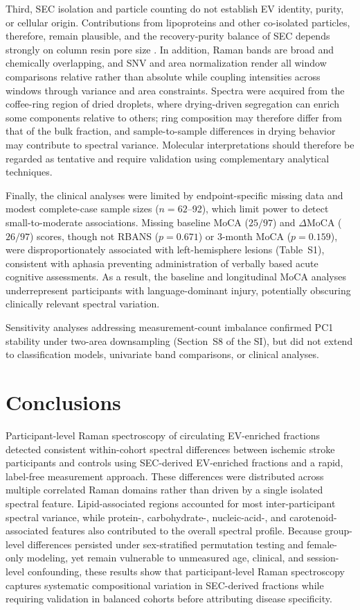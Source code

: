 \documentclass[preprint,12pt]{elsarticle}
\begin{document}
Third, SEC isolation and particle counting do not establish EV identity, purity, or cellular origin. Contributions from lipoproteins and other co-isolated particles, therefore, remain plausible, and the recovery-purity balance of SEC depends strongly on column resin pore size \cite{bracht2024}. In addition, Raman bands are broad and chemically overlapping, and SNV and area normalization render all window comparisons relative rather than absolute while coupling intensities across windows through variance and area constraints. Spectra were acquired from the coffee-ring region of dried droplets, where drying-driven segregation can enrich some components relative to others; ring composition may therefore differ from that of the bulk fraction, and sample-to-sample differences in drying behavior may contribute to spectral variance. Molecular interpretations should therefore be regarded as tentative and require validation using complementary analytical techniques.

Finally, the clinical analyses were limited by endpoint-specific missing data and modest complete-case sample sizes ($n=62$--92), which limit power to detect small-to-moderate associations. Missing baseline MoCA ($25/97$) and $\Delta$MoCA ($26/97$) scores, though not RBANS ($p=0.671$) or 3-month MoCA ($p=0.159$), were disproportionately associated with left-hemisphere lesions (Table~S1), consistent with aphasia preventing administration of verbally based acute cognitive assessments. As a result, the baseline and longitudinal MoCA analyses underrepresent participants with language-dominant injury, potentially obscuring clinically relevant spectral variation.

Sensitivity analyses addressing measurement-count imbalance confirmed PC1 stability under two-area downsampling (Section~S8 of the SI), but did not extend to classification models, univariate band comparisons, or clinical analyses.


\section{Conclusions} 
\label{sec:conclusions}

Participant-level Raman spectroscopy of circulating EV-enriched fractions detected consistent within-cohort spectral differences between ischemic stroke participants and controls using SEC-derived EV-enriched fractions and a rapid, label-free measurement approach. These differences were distributed across multiple correlated Raman domains rather than driven by a single isolated spectral feature. Lipid-associated regions accounted for most inter-participant spectral variance, while protein-, carbohydrate-, nucleic-acid-, and carotenoid-associated features also contributed to the overall spectral profile. Because group-level differences persisted under sex-stratified permutation testing and female-only modeling, yet remain vulnerable to unmeasured age, clinical, and session-level confounding, these results show that participant-level Raman spectroscopy captures systematic compositional variation in SEC-derived fractions while requiring validation in balanced cohorts before attributing disease specificity.
\end{document}
